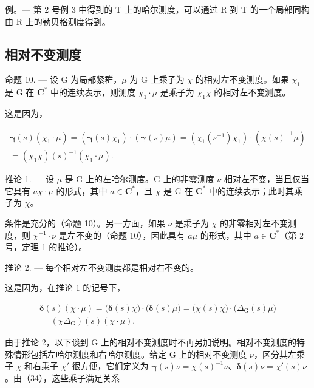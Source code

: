例。--- 第 2 号例 3 中得到的 T 上的哈尔测度，可以通过 R 到 T 的一个局部同构由 R 上的勒贝格测度得到。

\subsection{相对不变测度}

命题 10. --- 设 G 为局部紧群，\(\mu\) 为 G 上乘子为 \(\chi\) 的相对左不变测度。如果 \(\chi_{1}\) 是 G 在 \(\mathbf{C}^{*}\) 中的连续表示，则测度 \(\chi_{1} \cdot \mu\) 是乘子为 \(\chi_{1}\chi\) 的相对左不变测度。

这是因为，

\[
\begin{array}{r} \pmb {\gamma} (s) (\chi_ {1} \cdot \mu) = (\pmb {\gamma} (s) \chi_ {1}) \cdot (\pmb {\gamma} (s) \mu) = (\chi_ {1} (s ^ {- 1}) \chi_ {1}) \cdot (\chi (s) ^ {- 1} \mu) \\ = (\chi_ {1} \chi) (s) ^ {- 1} (\chi_ {1} \cdot \mu). \end{array}
\]

推论 1. --- 设 \(\mu\) 是 G 上的左哈尔测度。G 上的非零测度 \(\nu\) 相对左不变，当且仅当它具有 \(a\chi \cdot \mu\) 的形式，其中 \(a \in \mathbf{C}^*\)，且 \(\chi\) 是 G 在 \(\mathbf{C}^*\) 中的连续表示；此时其乘子为 \(\chi\)。

条件是充分的（命题 10）。另一方面，如果 \(\nu\) 是乘子为 \(\chi\) 的非零相对左不变测度，则 \(\chi^{-1} \cdot \nu\) 是左不变的（命题 10），因此具有 \(a\mu\) 的形式，其中 \(a \in \mathbf{C}^*\)（第 2 号，定理 1 的推论）。

推论 2. --- 每个相对左不变测度都是相对右不变的。

这是因为，在推论 1 的记号下，

\[
\begin{array}{c} \boldsymbol {\delta} (s) (\chi \cdot \mu) = \bigl (\boldsymbol {\delta} (s) \chi \bigr) \cdot \bigl (\boldsymbol {\delta} (s) \mu \bigr) = \bigl (\chi (s) \chi \bigr) \cdot \bigl (\Delta_ {\mathrm{G}} (s) \mu \bigr) \\ = (\chi \Delta_ {\mathrm{G}}) (s) (\chi \cdot \mu). \end{array}\tag{34}
\]

由于推论 2，以下谈到 G 上的相对不变测度时不再另加说明。相对不变测度的特殊情形包括左哈尔测度和右哈尔测度。给定 G 上的相对不变测度 \(\nu\)，区分其左乘子 \(\chi\) 和右乘子 \(\chi'\) 很方便，它们定义为 \(\pmb{\gamma}(s)\nu = \chi(s)^{-1}\nu\)、\(\pmb{\delta}(s)\nu = \chi'(s)\nu\)。由（34），这些乘子满足关系

